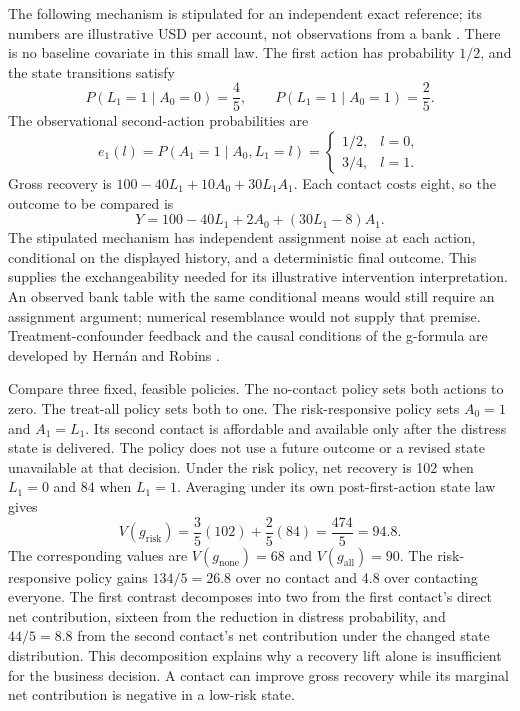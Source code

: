 The following mechanism is stipulated for an independent exact reference; its
numbers are illustrative USD per account, not observations from a bank
\citep{exec14_workflow_oracle}. There is no baseline covariate in this small law.
The first action has probability $1/2$, and the state transitions satisfy
\[
 P(L_1=1\mid A_0=0)=\frac45,\qquad
 P(L_1=1\mid A_0=1)=\frac25.
\]
The observational second-action probabilities are
\[
 e_1(l)=P(A_1=1\mid A_0,L_1=l)
 =\begin{cases}1/2,&l=0,\\3/4,&l=1.\end{cases}
\]
Gross recovery is $100-40L_1+10A_0+30L_1A_1$. Each contact costs eight, so the
outcome to be compared is
\[
 Y=100-40L_1+2A_0+(30L_1-8)A_1.
 \label{eq:exec14-l5-net}
\]
The stipulated mechanism has independent assignment noise at each action,
conditional on the displayed history, and a deterministic final outcome.
This supplies the exchangeability needed for its illustrative intervention
interpretation. An observed bank table with the same conditional means would
still require an assignment argument; numerical resemblance would not supply
that premise. Treatment-confounder feedback and the causal conditions of the
g-formula are developed by Hern\'an and Robins \citep{hernan2020}.

Compare three fixed, feasible policies. The no-contact policy sets both
actions to zero. The treat-all policy sets both to one. The risk-responsive
policy sets $A_0=1$ and $A_1=L_1$. Its second contact is affordable and available
only after the distress state is delivered. The policy does not use a future
outcome or a revised state unavailable at that decision. Under the risk policy,
net recovery is 102 when $L_1=0$ and 84 when $L_1=1$. Averaging under its own
post-first-action state law gives
\[
 V(g_{\mathrm{risk}})=\frac35(102)+\frac25(84)
 =\frac{474}{5}=94.8.
\]
The corresponding values are $V(g_{\mathrm{none}})=68$ and
$V(g_{\mathrm{all}})=90$. The risk-responsive policy gains
$134/5=26.8$ over no contact and 4.8 over contacting everyone. The first contrast
decomposes into two from the first contact's direct net contribution, sixteen
from the reduction in distress probability, and $44/5=8.8$ from the second
contact's net contribution under the changed state distribution. This
decomposition explains why a recovery lift alone is insufficient for the
business decision. A contact can improve gross recovery while its marginal
net contribution is negative in a low-risk state.

